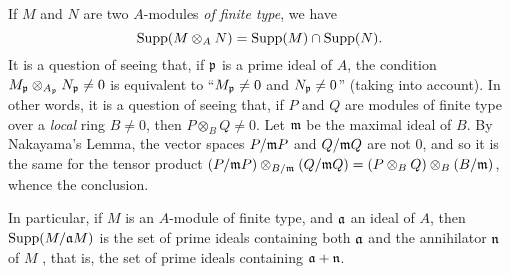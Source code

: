 \begin{env}[1.7.5]
\label{0.1.7.5}
If $M$ and $N$ are two $A$-modules {\em of finite type}, we have
\[
  {\mathop{\mathrm{Supp}}\nolimits}(M\otimes_A N)={\mathop{\mathrm{Supp}}\nolimits}(M)\cap{\mathop{\mathrm{Supp}}\nolimits}(N).
\]
It is a question of seeing that, if $\mathfrak{p}$ is a prime ideal of $A$, the condition
$M_\mathfrak{p}\otimes_{A_\mathfrak{p}}N_\mathfrak{p}\neq 0$ is equivalent to
``$M_\mathfrak{p}\neq 0$ and $N_\mathfrak{p}\neq 0$'' (taking  into account).
In other words, it is a question of seeing that, if $P$ and $Q$ are
modules of finite type over a {\em local} ring $B\neq 0$, then
$P\otimes_B Q\neq 0$. Let $\mathfrak{m}$ be the maximal ideal of $B$. By
Nakayama's Lemma, the vector spaces $P/\mathfrak{m}P$ and $Q/\mathfrak{m}Q$
are not $0$, and so it is the same for the tensor product
$(P/\mathfrak{m}P)\otimes_{B/\mathfrak{m}}(Q/\mathfrak{m}Q)
  =(P\otimes_B Q)\otimes_B(B/\mathfrak{m})$, whence the conclusion.

In particular, if $M$ is an $A$-module of finite type, and $\mathfrak{a}$ an ideal
of $A$, then ${\mathop{\mathrm{Supp}}\nolimits}(M/\mathfrak{a}M)$ is the set of prime ideals containing both
$\mathfrak{a}$ and the annihilator $\mathfrak{n}$ of $M$ , that
is, the set of prime ideals containing $\mathfrak{a}+\mathfrak{n}$.
\end{env}
